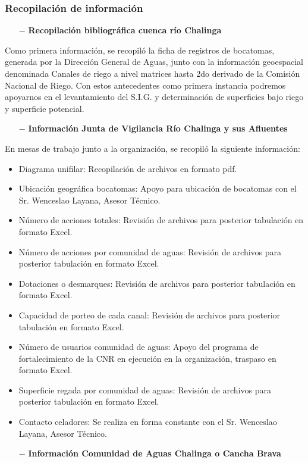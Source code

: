 \documentclass[]{article}
\begin{document}
\subsubsection{Recopilación de información}

\begin{itemize}
	\item[$-$] \textbf{Recopilación bibliográfica cuenca río Chalinga}
\end{itemize}

Como primera información, se recopiló la ficha de registros de bocatomas, generada por la Dirección General de Aguas, junto con la información geoespacial denominada Canales de riego a nivel matrices hasta 2do derivado de la Comisión Nacional de Riego. Con estos antecedentes como primera instancia podremos apoyarnos en el levantamiento del S.I.G. y determinación de superficies bajo riego y superficie potencial.

\begin{itemize}
	\item[$-$] \textbf{Información Junta de Vigilancia Río Chalinga y sus Afluentes}
\end{itemize}

En mesas de trabajo junto a la organización, se recopiló la siguiente información:

\begin{itemize}	
	\item Diagrama unifilar: Recopilación de archivos en formato pdf.
	\item Ubicación geográfica bocatomas: Apoyo para ubicación de bocatomas con el Sr. Wenceslao Layana, Asesor Técnico.
	\item Número de acciones totales: Revisión de archivos para posterior tabulación en formato Excel.
	\item Número de acciones por comunidad de aguas: Revisión de archivos para posterior tabulación en formato Excel.
	\item Dotaciones o desmarques: Revisión de archivos para posterior tabulación en formato Excel.
	\item Capacidad de porteo de cada canal: Revisión de archivos para posterior tabulación en formato Excel.
	\item Número de usuarios comunidad de aguas: Apoyo del programa de fortalecimiento de la CNR en ejecución en la organización, traspaso en formato Excel.
	\item Superficie regada por comunidad de aguas: Revisión de archivos para posterior tabulación en formato Excel.
	\item Contacto celadores: Se realiza en forma constante con el Sr. Wenceslao Layana, Asesor Técnico.
\end{itemize}
\clearpage
\begin{itemize}
	\item[$-$] \textbf{Información Comunidad de Aguas Chalinga o Cancha Brava}
\end{itemize}
\end{document}
